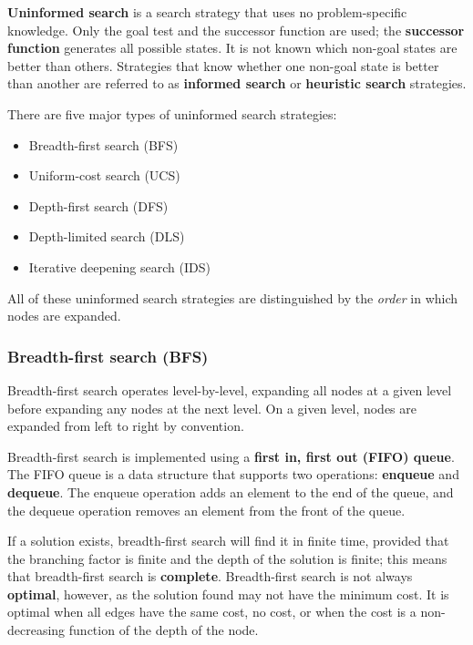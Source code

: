 
\begin{definition}
    \textbf{Uninformed search} is a search strategy that uses no problem-specific knowledge. Only the goal test and the successor function are used; the \textbf{successor function} generates all possible states. It is not known which non-goal states are better than others. Strategies that know whether one non-goal state is better than another are referred to as \textbf{informed search} or \textbf{heuristic search} strategies.
\end{definition}

There are five major types of uninformed search strategies:
\begin{itemize}
    \item Breadth-first search (BFS)
    \item Uniform-cost search (UCS)
    \item Depth-first search (DFS)
    \item Depth-limited search (DLS)
    \item Iterative deepening search (IDS)
\end{itemize}
All of these uninformed search strategies are distinguished by the \emph{order} in which nodes are expanded.

\subsubsection{Breadth-first search (BFS)}
\label{sub_sec:breadth_first_search}

Breadth-first search operates level-by-level, expanding all nodes at a given level before expanding any nodes at the next level. On a given level, nodes are expanded from left to right by convention.

\begin{definition}
    Breadth-first search is implemented using a \textbf{first in, first out (FIFO) queue}. The FIFO queue is a data structure that supports two operations: \textbf{enqueue} and \textbf{dequeue}. The enqueue operation adds an element to the end of the queue, and the dequeue operation removes an element from the front of the queue.
\end{definition}

\begin{definition}
    If a solution exists, breadth-first search will find it in finite time, provided that the branching factor is finite and the depth of the solution is finite; this means that breadth-first search is \textbf{complete}. Breadth-first search is not always \textbf{optimal}, however, as the solution found may not have the minimum cost. It is optimal when all edges have the same cost, no cost, or when the cost is a non-decreasing function of the depth of the node.
\end{definition}

